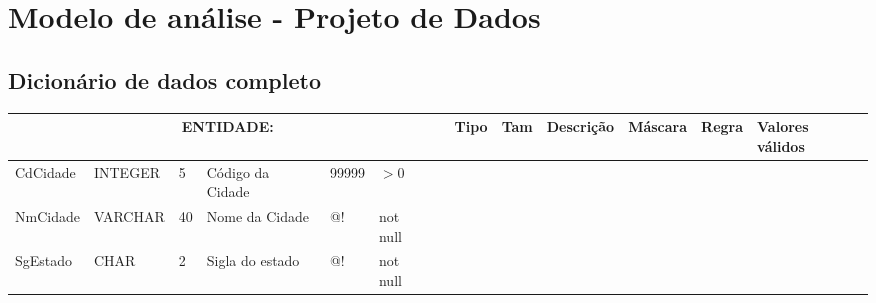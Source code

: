 \section{Modelo de análise - Projeto de Dados}

   \noindent {}
   
    \noindent {}
   
   \subsection{Dicionário de dados completo}
   
   {\color{red}{Exemplos:}}
   
   \begin{center}
       
        \begin{longtable}{|p{2cm}|p{2cm}|p{1cm}|p{3.5cm}|p{1.8cm}|p{1.5cm}|p{2cm}|}
       
            \hline
            
            \multicolumn{7}{|c|}{
                \textbf{ENTIDADE: {\color{blue}{CIDADE}}}
            } \endhead \hline
            
            \textbf{Nome} & 
            \textbf{Tipo} &
            \textbf{Tam}  &
            \textbf{Descrição} &
            \textbf{Máscara} &
            \textbf{Regra} &
            \textbf{Valores válidos} \\ \hline
            
            CdCidade &
            INTEGER &
            5 &
            Código da Cidade &
            99999 &
            $> 0$ & \\ \hline
            
            NmCidade &
            VARCHAR &
            40 &
            Nome da Cidade &
            @! &
            not null & \\ \hline
            
            SgEstado &
            CHAR &
            2 &
            Sigla do estado &
            @! &
            not null & \\ \hline
       
       \end{longtable}
       
       

\end{center}
